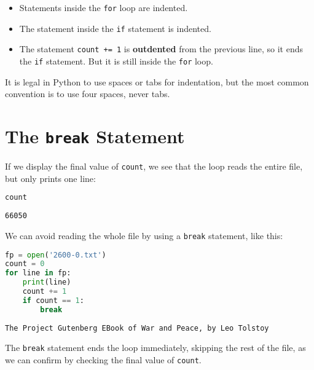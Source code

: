 \begin{itemize}
\item
  Statements inside the \passthrough{\lstinline!for!} loop are indented.
\item
  The statement inside the \passthrough{\lstinline!if!} statement is
  indented.
\item
  The statement \passthrough{\lstinline!count += 1!} is
  \textbf{outdented} from the previous line, so it ends the
  \passthrough{\lstinline!if!} statement. But it is still inside the
  \passthrough{\lstinline!for!} loop.
\end{itemize}

It is legal in Python to use spaces or tabs for indentation, but the
most common convention is to use four spaces, never tabs.

\section{\texorpdfstring{The \texttt{break}
Statement}{The break Statement}}\label{the-break-statement}

If we display the final value of \passthrough{\lstinline!count!}, we see
that the loop reads the entire file, but only prints one line:

\begin{lstlisting}[language=Python,style=source]
count
\end{lstlisting}

\begin{lstlisting}[style=output]
66050
\end{lstlisting}

We can avoid reading the whole file by using a
\passthrough{\lstinline!break!} statement, like this:

\begin{lstlisting}[language=Python,style=source]
fp = open('2600-0.txt')
count = 0
for line in fp:
    print(line)
    count += 1
    if count == 1:
        break
\end{lstlisting}

\begin{lstlisting}[style=output]
The Project Gutenberg EBook of War and Peace, by Leo Tolstoy
\end{lstlisting}

The \passthrough{\lstinline!break!} statement ends the loop immediately,
skipping the rest of the file, as we can confirm by checking the final
value of \passthrough{\lstinline!count!}.

